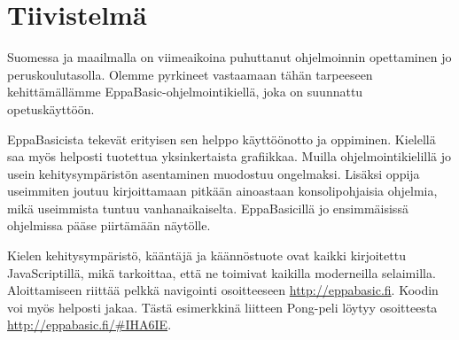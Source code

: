 
\section*{Tiivistelmä}
Suomessa ja maailmalla on viimeaikoina puhuttanut
ohjelmoinnin opettaminen jo peruskoulutasolla.
Olemme pyrkineet vastaamaan tähän tarpeeseen
kehittämällämme EppaBasic-ohjelmointikiellä, joka
on suunnattu opetuskäyttöön.

EppaBasicista tekevät erityisen sen helppo käyttöönotto
ja oppiminen. Kielellä saa myös helposti tuotettua
yksinkertaista grafiikkaa. Muilla ohjelmointikielillä
jo usein kehitysympäristön asentaminen muodostuu ongelmaksi.
Lisäksi oppija useimmiten joutuu kirjoittamaan pitkään
ainoastaan konsolipohjaisia ohjelmia, mikä useimmista
tuntuu vanhanaikaiselta. EppaBasicillä jo ensimmäisissä
ohjelmissa pääse piirtämään näytölle.

Kielen kehitysympäristö, kääntäjä ja käännöstuote ovat
kaikki kirjoitettu JavaScriptillä, mikä tarkoittaa, että
ne toimivat kaikilla moderneilla selaimilla. Aloittamiseen
riittää pelkkä navigointi osoitteeseen \url{http://eppabasic.fi}.
Koodin voi myös helposti jakaa. Tästä esimerkkinä liitteen
Pong-peli löytyy osoitteesta \url{http://eppabasic.fi/#IHA6IE}.